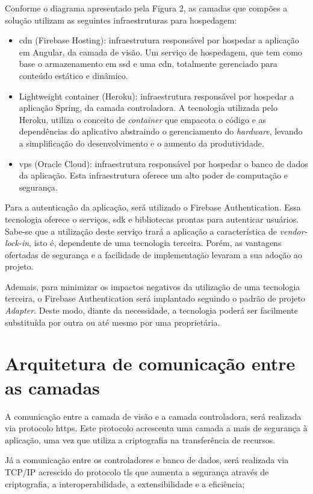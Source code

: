 \documentclass[
    12pt,               %
    openright,          %
    oneside,
    a4paper,            %
    paginasA3,  %
    english,            %
    brazil              %
    ]{ifsp-spo-inf-ctds} %
\begin{document}
Conforme o diagrama apresentado pela Figura 2, as camadas que compões a solução utilizam as seguintes infraestruturas para hospedagem:
\begin{itemize}
\item \ac{cdn} (Firebase Hosting): infraestrutura responsável por hospedar a aplicação em Angular, da camada de visão. Um serviço de hospedagem, que tem como base o armazenamento em \ac{ssd} e uma \ac{cdn}, totalmente gerenciado para conteúdo estático e dinâmico.
\item  Lightweight container (Heroku): infraestrutura responsável por hospedar a aplicação Spring, da camada controladora. A tecnologia utilizada pelo Heroku, utiliza o conceito de \textit{\gls{container}} que empacota o código e as dependências do aplicativo abstraindo o gerenciamento do \textit{\gls{hardware}}, levando a simplificação do desenvolvimento e o aumento da produtividade.
\item \ac{vps} (Oracle Cloud): infraestrutura responsável por hospedar o banco de dados da aplicação. Esta infraestrutura oferece um alto poder de computação e segurança.
\end{itemize}
Para a autenticação da aplicação, será utilizado o Firebase Authentication. Essa tecnologia oferece o serviços, \ac{sdk} e bibliotecas prontas para autenticar usuários. Sabe-se que a utilização deste serviço trará a aplicação a característica de \textit{\gls{vendor-lock-in}}, isto é, dependente de uma tecnologia terceira.  Porém, as vantagens ofertadas de segurança e a facilidade de implementação levaram a sua adoção ao projeto. 

Ademais, para minimizar os impactos negativos da utilização de uma tecnologia terceira, o Firebase Authentication será implantado seguindo o padrão de projeto \textit{Adapter}. Deste modo, diante da necessidade, a tecnologia poderá ser facilmente substituída por outra ou até mesmo por uma proprietária.


\section{Arquitetura de comunicação entre as camadas}
A comunicação entre a camada de visão e a camada controladora, será realizada via protocolo \ac{https}. Este protocolo acrescenta uma camada a mais de segurança à aplicação, uma vez que utiliza a criptografia na transferência de recursos.


Já a comunicação entre os controladores e banco de dados, será realizada via TCP/IP acrescido do protocolo \ac{tls} que aumenta a segurança através de criptografia, a interoperabilidade, a extensibilidade e a eficiência;
\end{document}
